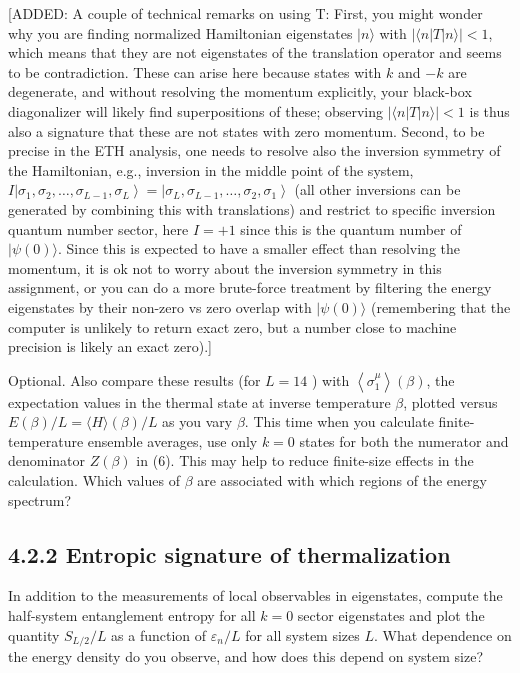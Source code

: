 \documentclass[12pt]{article}
\begin{document}
[ADDED: A couple of technical remarks on using T: First, you might wonder why you are finding normalized Hamiltonian eigenstates $|n\rangle$ with $|\langle n|T| n\rangle|<1$, which means that they are not eigenstates of the translation operator and seems to be contradiction. These can arise here because states with $k$ and $-k$ are degenerate, and without resolving the momentum explicitly, your black-box diagonalizer will likely find superpositions of these; observing $|\langle n|T| n\rangle|<1$ is thus also a signature that these are not states with zero momentum. Second, to be precise in the ETH analysis, one needs to resolve also the inversion symmetry of the Hamiltonian, e.g., inversion in the middle point of the system, $I\left|\sigma_{1}, \sigma_{2}, \ldots, \sigma_{L-1}, \sigma_{L}\right\rangle=\left|\sigma_{L}, \sigma_{L-1}, \ldots, \sigma_{2}, \sigma_{1}\right\rangle$ (all other inversions can be generated by combining this with translations) and restrict to specific inversion quantum number sector, here $I=+1$ since this is the quantum number of $|\psi(0)\rangle$. Since this is expected to have a smaller effect than resolving the momentum, it is ok not to worry about the inversion symmetry in this assignment, or you can do a more brute-force treatment by filtering the energy eigenstates by their non-zero vs zero overlap with $|\psi(0)\rangle$ (remembering that the computer is unlikely to return exact zero, but a number close to machine precision is likely an exact zero).]

Optional. Also compare these results (for $L=14$ ) with $\left\langle\sigma_{1}^{\mu}\right\rangle(\beta)$, the expectation values in the thermal state at inverse temperature $\beta$, plotted versus $E(\beta) / L=\langle H\rangle(\beta) / L$ as you vary $\beta$. This time when you calculate finite-temperature ensemble averages, use only $k=0$ states for both the numerator and denominator $Z(\beta)$ in (6). This may help to reduce finite-size effects in the calculation. Which values of $\beta$ are associated with which regions of the energy spectrum?

\subsection*{4.2.2 Entropic signature of thermalization}
In addition to the measurements of local observables in eigenstates, compute the half-system entanglement entropy for all $k=0$ sector eigenstates and plot the quantity $S_{L / 2} / L$ as a function of $\varepsilon_{n} / L$ for all system sizes $L$. What dependence on the energy density do you observe, and how does this depend on system size?
\end{document}
